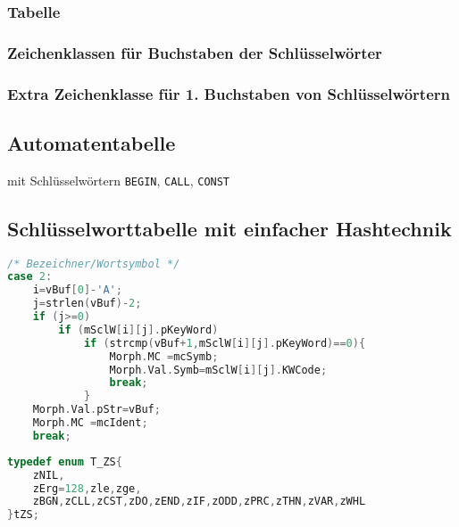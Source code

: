\subsubsection{Tabelle}
\subsubsection{Zeichenklassen für Buchstaben der Schlüsselwörter}
\subsubsection{Extra Zeichenklasse für 1. Buchstaben von Schlüsselwörtern}
\subsection{Automatentabelle}
mit Schlüsselwörtern \lstinline`BEGIN`, \lstinline`CALL`, \lstinline`CONST`

\subsection{Schlüsselworttabelle mit einfacher Hashtechnik}

\begin{lstlisting}[language=C]
/* Bezeichner/Wortsymbol */
case 2:
	i=vBuf[0]-'A';
	j=strlen(vBuf)-2;
	if (j>=0)
		if (mSclW[i][j].pKeyWord)
			if (strcmp(vBuf+1,mSclW[i][j].pKeyWord)==0){
				Morph.MC =mcSymb;
				Morph.Val.Symb=mSclW[i][j].KWCode;
				break;
			}
	Morph.Val.pStr=vBuf;
	Morph.MC =mcIdent;
	break;
\end{lstlisting}
\begin{lstlisting}[language=C]	
typedef enum T_ZS{
	zNIL,
	zErg=128,zle,zge,
	zBGN,zCLL,zCST,zDO,zEND,zIF,zODD,zPRC,zTHN,zVAR,zWHL
}tZS;
\end{lstlisting}



